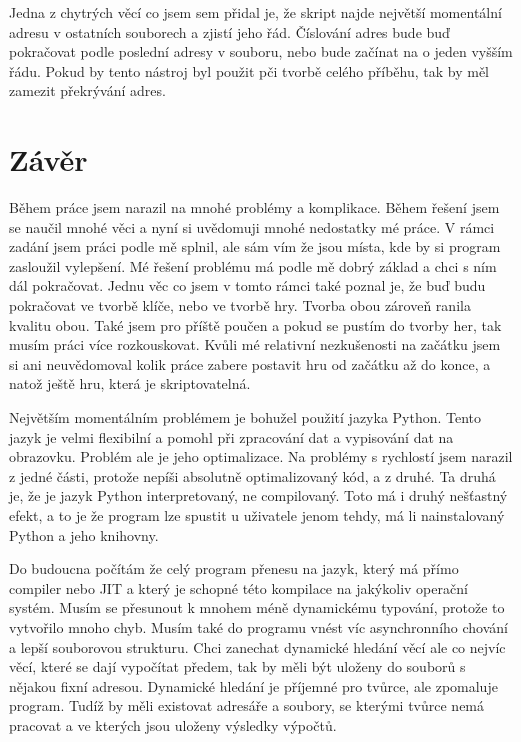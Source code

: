 \documentclass[12pt,a4paper]{article}
\begin{document}
Jedna z chytrých věcí co jsem sem přidal je, že skript najde největší momentální adresu v ostatních souborech a zjistí jeho řád. Číslování adres bude buď pokračovat podle poslední adresy v souboru, nebo bude začínat na o jeden vyšším řádu. Pokud by tento nástroj byl použit pči tvorbě celého příběhu, tak by měl zamezit překrývání adres.


\section{Závěr}
Během práce jsem narazil na mnohé problémy a komplikace. Během řešení jsem se naučil mnohé věci a nyní si uvědomuji mnohé nedostatky mé práce. V rámci zadání jsem práci podle mě splnil, ale sám vím že jsou místa, kde by si program zasloužil vylepšení. Mé řešení problému má podle mě dobrý základ a chci s ním dál pokračovat. Jednu věc co jsem v tomto rámci také poznal je, že buď budu pokračovat ve tvorbě klíče, nebo ve tvorbě hry. Tvorba obou zároveň ranila kvalitu obou. Také jsem pro příště poučen a pokud se pustím do tvorby her, tak musím práci více rozkouskovat. Kvůli mé relativní nezkušenosti na začátku jsem si ani neuvědomoval kolik práce zabere postavit hru od začátku až do konce, a natož ještě hru, která je skriptovatelná.

Největším momentálním problémem je bohužel použití jazyka Python. Tento jazyk je velmi flexibilní a pomohl při zpracování dat a vypisování dat na obrazovku. Problém ale je jeho optimalizace. Na problémy s rychlostí jsem narazil z jedné části, protože nepíši absolutně optimalizovaný kód, a z druhé. Ta druhá je, že je jazyk Python interpretovaný, ne compilovaný. Toto má i druhý nešťastný efekt, a to je že program lze spustit u uživatele jenom tehdy, má li nainstalovaný Python a jeho knihovny.

Do budoucna počítám že celý program přenesu na jazyk, který má přímo compiler nebo JIT a který je schopné této kompilace na jakýkoliv operační systém. Musím se přesunout k mnohem méně dynamickému typování, protože to vytvořilo mnoho chyb. Musím také do programu vnést víc asynchronního chování a lepší souborovou strukturu. Chci zanechat dynamické hledání věcí ale co nejvíc věcí, které se dají vypočítat předem, tak by měli být uloženy do souborů s nějakou fixní adresou. Dynamické hledání je příjemné pro tvůrce, ale zpomaluje program. Tudíž by měli existovat adresáře a soubory, se kterými tvůrce nemá pracovat a ve kterých jsou uloženy výsledky výpočtů.
\end{document}
